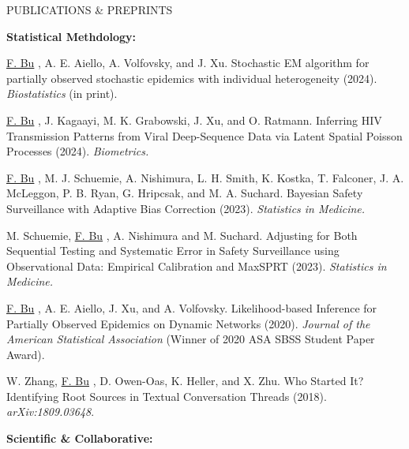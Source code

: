 \documentclass{resume} %
\newcommand{\myName}[1]{
	\underline{#1}
}
\begin{document}
\begin{rSection}{PUBLICATIONS \& PREPRINTS}

\hspace{-.2in} \textbf{Statistical Methdology:}

\myName{F. Bu}, A. E. Aiello, A. Volfovsky, and J. Xu.  
Stochastic EM algorithm for partially observed stochastic epidemics with individual heterogeneity (2024).  \emph{Biostatistics} (in print).%

\smallskip

\myName{F. Bu}, J. Kagaayi, M. K. Grabowski, J. Xu, and O. Ratmann.
Inferring HIV Transmission Patterns from Viral Deep-Sequence Data via Latent Spatial Poisson Processes (2024). \emph{Biometrics.} 

\smallskip

\myName{F. Bu}, M. J. Schuemie,  A. Nishimura, L. H. Smith, K. Kostka, T. Falconer, J. A. McLeggon, P. B. Ryan, G. Hripcsak, and M. A. Suchard.
Bayesian Safety Surveillance with Adaptive Bias Correction (2023). \emph{Statistics in Medicine.} %

\smallskip


M. Schuemie, \myName{F. Bu}, A. Nishimura and M. Suchard.
Adjusting for Both Sequential Testing and Systematic Error in Safety Surveillance using Observational Data: Empirical Calibration and MaxSPRT (2023). \emph{Statistics in Medicine.}

\smallskip


\myName{F. Bu}, A. E. Aiello, J. Xu, and A. Volfovsky. 
Likelihood-based Inference for Partially Observed Epidemics on Dynamic Networks (2020). \emph{Journal of the American Statistical Association} (Winner of 2020 ASA SBSS Student Paper Award). %

\smallskip

%

W. Zhang, \myName{F. Bu}, D. Owen-Oas, K. Heller, and X. Zhu. 
Who Started It? Identifying Root Sources in Textual Conversation Threads (2018). \emph{arXiv:1809.03648}.

\medskip

\hspace{-.2in} \textbf{Scientific \& Collaborative:}


\end{rSection}
\end{document}
